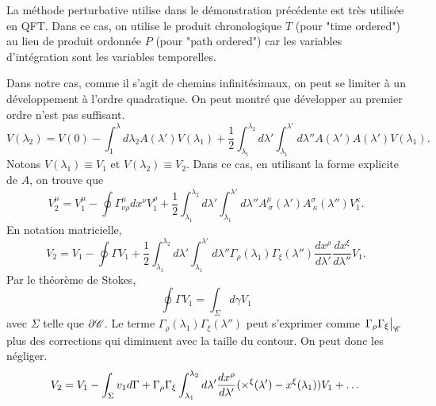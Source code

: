 \documentclass[a4paper,11pt]{report}
\begin{document}
                \begin{rmk}
                    La méthode perturbative utilise dans le démonstration précédente est très utilisée en QFT. Dans ce cas, on utilise le produit chronologique $T$ (pour "time ordered") au lieu de produit ordonnée $P$ (pour "path ordered") car les variables d'intégration sont les variables temporelles.
                \end{rmk}
                
                Dans notre cas, comme il s'agit de chemins infinitésimaux, on peut se limiter à un développement à l'ordre quadratique. On peut montré que développer au premier ordre n'est pas suffisant.
                \begin{equation}
                        V(\lambda_2) = V(0) - \int_1^\lambda d\lambda_2 A(\lambda')V(\lambda_1)+\frac{1}{2}\int_{\lambda_1}^{\lambda_2} d\lambda'\int_{\lambda_1}^{\lambda'}d\lambda''A(\lambda')A(\lambda')V(\lambda_1).
                    \end{equation}
                Notons $V(\lambda_1)\equiv V_1$ et $V(\lambda_2)\equiv V_2$. Dans ce cas, en utilisant la forme explicite de $A$, on trouve que 
                \begin{equation}
                    V_2^\mu = V_1^\mu - \oint \Gamma^\mu_{\nu\rho} dx^\nu V_1^\rho+\frac{1}{2}\int_{\lambda_1}^{\lambda_2} d\lambda'\int_{\lambda_1}^{\lambda'}d\lambda''A^\mu_{~\sigma}(\lambda')A^\sigma_{~\kappa}(\lambda'')V_1^\kappa.
                \end{equation}
                En notation matricielle, 
                \begin{equation}
                    V_2 = V_1 - \oint \Gamma V_1+\frac{1}{2}\int_{\lambda_1}^{\lambda_2} d\lambda'\int_{\lambda_1}^{\lambda'}d\lambda''\Gamma_\rho(\lambda_1)\Gamma_\xi(\lambda'')\frac{dx^\rho}{d\lambda'}\frac{dx^\xi}{d\lambda''} V_1.
                \end{equation}
                Par le théorème de Stokes,
                \begin{equation}
                     \oint \Gamma V_1 = \int_\Sigma d\gamma V_1
                \end{equation}
                avec $\Sigma$ telle que $\partial\mathscr{C}$. Le terme $\Gamma_\rho(\lambda_1)\Gamma_\xi(\lambda'')$ peut s'exprimer comme $\eval{\Gamma_\rho\Gamma_\xi}_\mathscr{C}$ plus des corrections qui diminuent avec la taille du contour. On peut donc les négliger.
                \begin{equation}
                    V_2 = V_1-\int_\Sigma v_1 d\Gamma + \Gamma_\rho\Gamma_\xi \int_{\lambda_1}^{\lambda_2}d\lambda'\frac{dx^\rho}{d\lambda'}(\times^\xi(\lambda')-x^\xi(\lambda_1))V_1+\dots
                \end{equation}
\end{document}
